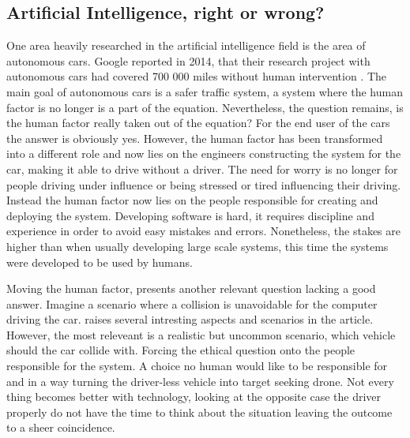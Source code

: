 \subsection{Artificial Intelligence, right or wrong? }
\label{sec:hawkins}

One area heavily researched in the artificial intelligence field is the area of autonomous cars. Google reported in 2014, that their research project with autonomous cars had covered 700 000 miles without human intervention \parencite{Urmson2014:Online}. The main goal of autonomous cars is a safer traffic system, a system where the human factor is no longer is a part of the equation. Nevertheless, the question remains, is the human factor really taken out of the equation? For the end user of the cars the answer is obviously yes. However, the human factor has been transformed into a different role and now lies on the engineers constructing the system for the car, making it able to drive without a driver. The need for worry is no longer for people driving under influence or being stressed or tired influencing their driving. Instead the human factor now lies on the people responsible for creating and deploying the system. Developing software is hard, it requires discipline and experience in order to avoid easy mistakes and errors. Nonetheless, the stakes are higher than when usually developing large scale systems, this time the systems were developed to be used by humans. 

Moving the human factor, presents another relevant question lacking a good answer. Imagine a scenario where a collision is unavoidable for the computer driving the car. \textcite{Lin:Online} raises several intresting aspects and scenarios in the article. However, the most releveant is a realistic but uncommon scenario, which vehicle should the car collide with. Forcing the ethical question onto the people responsible for the system. A choice no human would like to be responsible for and in a way turning the driver-less vehicle into target seeking drone. Not every thing becomes better with technology, looking at the opposite case the driver properly do not have the time to think about the situation leaving the outcome to a sheer coincidence.